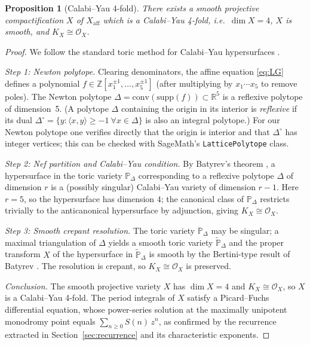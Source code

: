 \documentclass[11pt, a4paper]{article}
\newtheorem{proposition}[theorem]{Proposition}
\begin{document}
\begin{proposition}[Calabi--Yau 4-fold]\label{prop:CY4}
There exists a smooth projective compactification $X$ of
$X_{\mathrm{aff}}$ which is a Calabi--Yau 4-fold, i.e.\
$\dim X = 4$, $X$ is smooth, and $K_X \cong \mathcal{O}_X$.
\end{proposition}

\begin{proof}
We follow the standard toric method for Calabi--Yau hypersurfaces
\cite{Batyrev1994,Almkvist2005}.

\smallskip\noindent
\textit{Step 1: Newton polytope.}
Clearing denominators, the affine equation \eqref{eq:LG} defines a
polynomial $f\in\mathbb{Z}[x_1^{\pm1},\dots,x_5^{\pm1}]$ (after multiplying
by $x_1\cdots x_5$ to remove poles).  The Newton polytope
$\Delta = \mathrm{conv}(\mathrm{supp}(f))\subset\mathbb{R}^5$ is a
reflexive polytope of dimension~5.  (A polytope $\Delta$ containing the
origin in its interior is \emph{reflexive} if its dual
$\Delta^\circ=\{y:\langle x,y\rangle\ge-1\ \forall x\in\Delta\}$
is also an integral polytope.)  For our Newton polytope one verifies
directly that the origin is interior and that $\Delta^\circ$ has integer
vertices; this can be checked with SageMath's \texttt{LatticePolytope}
class.

\smallskip\noindent
\textit{Step 2: Nef partition and Calabi--Yau condition.}
By Batyrev's theorem \cite{Batyrev1994}, a hypersurface in the toric
variety $\mathbb{P}_\Delta$ corresponding to a reflexive polytope $\Delta$
of dimension $r$ is a (possibly singular) Calabi--Yau variety of dimension
$r-1$.  Here $r=5$, so the hypersurface has dimension $4$; the canonical
class of $\mathbb{P}_\Delta$ restricts trivially to the anticanonical
hypersurface by adjunction, giving $K_X\cong\mathcal{O}_X$.

\smallskip\noindent
\textit{Step 3: Smooth crepant resolution.}
The toric variety $\mathbb{P}_\Delta$ may be singular; a maximal
triangulation of $\Delta$ yields a smooth toric variety $\widetilde{\mathbb{P}}_\Delta$
and the proper transform $X$ of the hypersurface in $\widetilde{\mathbb{P}}_\Delta$
is smooth by the Bertini-type result of Batyrev \cite{Batyrev1994}.
The resolution is crepant, so $K_X\cong\mathcal{O}_X$ is preserved.

\smallskip\noindent
\textit{Conclusion.}
The smooth projective variety $X$ has $\dim X = 4$ and $K_X\cong\mathcal{O}_X$,
so $X$ is a Calabi--Yau 4-fold.  The period integrals of $X$ satisfy a
Picard--Fuchs differential equation, whose power-series solution at the
maximally unipotent monodromy point equals $\sum_{n\ge0}S(n)\,z^n$, as
confirmed by the recurrence extracted in Section~\ref{sec:recurrence} and
its characteristic exponents.
\end{proof}
\end{document}
